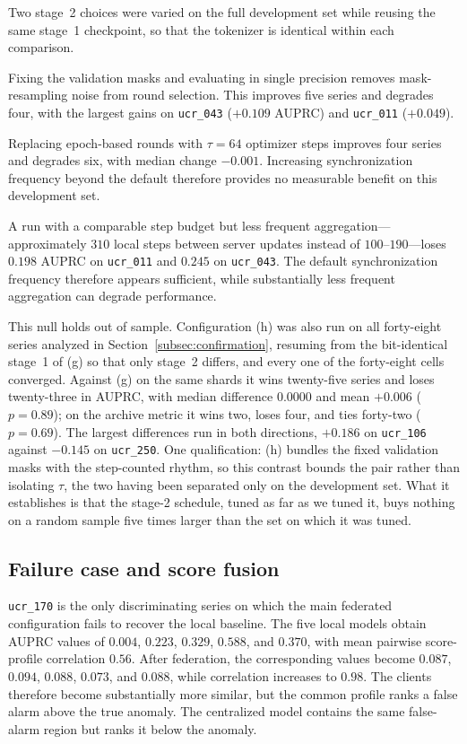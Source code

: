 \documentclass[conference]{IEEEtran}
\begin{document}
Two stage~2 choices were varied on the full development set while reusing the same stage~1 checkpoint, so that the tokenizer is identical within each comparison.

Fixing the validation masks and evaluating in single precision removes mask-resampling noise from round selection. This improves five series and degrades four, with the largest gains on \texttt{ucr\_043} ($+0.109$ AUPRC) and \texttt{ucr\_011} ($+0.049$).

Replacing epoch-based rounds with $\tau=64$ optimizer steps improves four series and degrades six, with median change $-0.001$. Increasing synchronization frequency beyond the default therefore provides no measurable benefit on this development set.

A run with a comparable step budget but less frequent aggregation---approximately $310$ local steps between server updates instead of $100$--$190$---loses $0.198$ AUPRC on \texttt{ucr\_011} and $0.245$ on \texttt{ucr\_043}. The default synchronization frequency therefore appears sufficient, while substantially less frequent aggregation can degrade performance.

This null holds out of sample. Configuration (h) was also run on all forty-eight series analyzed in
Section~\ref{subsec:confirmation}, resuming from the bit-identical stage~1 of (g) so that only
stage~2 differs, and every one of the forty-eight cells converged. Against (g) on the same shards
it wins twenty-five series and loses twenty-three in AUPRC, with median difference $0.0000$ and
mean $+0.006$ ($p=0.89$); on the archive metric it wins two, loses four, and ties forty-two
($p=0.69$). The largest differences run in both directions, $+0.186$ on \texttt{ucr\_106} against
$-0.145$ on \texttt{ucr\_250}. One qualification: (h) bundles the fixed validation masks with the
step-counted rhythm, so this contrast bounds the pair rather than isolating $\tau$, the two having
been separated only on the development set. What it establishes is that the stage-2 schedule, tuned
as far as we tuned it, buys nothing on a random sample five times larger than the set on which it
was tuned.

\subsection{Failure case and score fusion}
\label{subsec:failure}

\texttt{ucr\_170} is the only discriminating series on which the main federated configuration fails to recover the local baseline. The five local models obtain AUPRC values of $0.004$, $0.223$, $0.329$, $0.588$, and $0.370$, with mean pairwise score-profile correlation $0.56$. After federation, the corresponding values become $0.087$, $0.094$, $0.088$, $0.073$, and $0.088$, while correlation increases to $0.98$. The clients therefore become substantially more similar, but the common profile ranks a false alarm above the true anomaly. The centralized model contains the same false-alarm region but ranks it below the anomaly.
\end{document}
